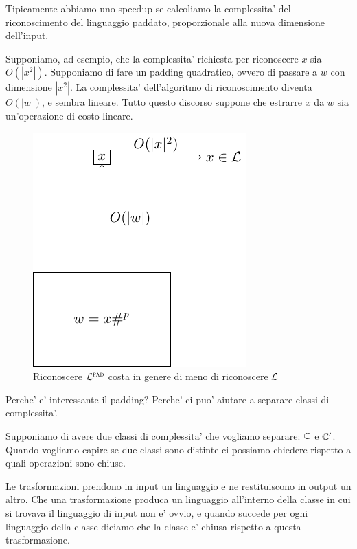 Tipicamente abbiamo uno speedup se calcoliamo la complessita' del riconoscimento del linguaggio
paddato, proporzionale alla nuova dimensione dell'input.

Supponiamo, ad esempio, che la complessita' richiesta per riconoscere $x$ sia $O(|x^{2}|)$.
Supponiamo di fare un padding quadratico, ovvero di passare a $w$ con dimensione $|x^{2}|$. La
complessita' dell'algoritmo di riconoscimento diventa $O(|w|)$, e sembra lineare. Tutto questo
discorso suppone che estrarre $x$ da $w$ sia un'operazione di costo lineare.

\begin{figure}[h]
    \begin{center}
        \includegraphics{./img/timespacehierarchies/PaddingSpeedup.pdf}    
        \caption{Riconoscere $\mathcal{L}^{\textsc{pad}}$ costa in genere di meno di riconoscere $\mathcal{L}$}
    \end{center}
\end{figure}

Perche' e' interessante il padding? Perche' ci puo' aiutare a separare classi di complessita'. 

Supponiamo di avere due classi di complessita' che vogliamo separare: $\mathbb{C}$ e $\mathbb{C}'$. Quando
vogliamo capire se due classi sono distinte ci possiamo chiedere rispetto a quali operazioni sono
chiuse.

Le trasformazioni prendono in input un linguaggio e ne restituiscono in output un altro. Che una
trasformazione produca un linguaggio all'interno della classe in cui si trovava il linguaggio di
input non e' ovvio, e quando succede per ogni linguaggio della classe diciamo che la classe e'
chiusa rispetto a questa trasformazione.

